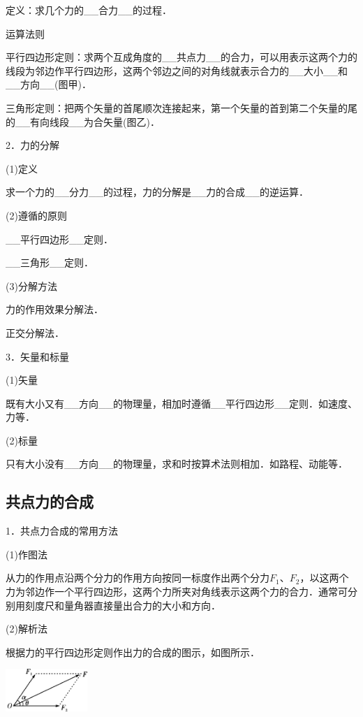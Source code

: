 定义：求几个力的\_\_合力\_\_的过程．

运算法则

平行四边形定则：求两个互成角度的\_\_共点力\_\_的合力，可以用表示这两个力的线段为邻边作平行四边形，这两个邻边之间的对角线就表示合力的\_\_大小\_\_和\_\_方向\_\_(图甲)．

三角形定则：把两个矢量的首尾顺次连接起来，第一个矢量的首到第二个矢量的尾的\_\_有向线段\_\_为合矢量(图乙)．

2．力的分解

(1)定义

求一个力的\_\_分力\_\_的过程，力的分解是\_\_力的合成\_\_的逆运算．

(2)遵循的原则

\_\_平行四边形\_\_定则．

\_\_三角形\_\_定则．

(3)分解方法

力的作用效果分解法．

正交分解法．

3．矢量和标量

(1)矢量

既有大小又有\_\_方向\_\_的物理量，相加时遵循\_\_平行四边形\_\_定则．如速度、力等．

(2)标量

只有大小没有\_\_方向\_\_的物理量，求和时按算术法则相加．如路程、动能等．
\newpage
\subsection{共点力的合成}

1．共点力合成的常用方法

(1)作图法

从力的作用点沿两个分力的作用方向按同一标度作出两个分力$F_1$、$F_2$，以这两个力为邻边作一个平行四边形，这两个力所夹对角线表示这两个力的合力．通常可分别用刻度尺和量角器直接量出合力的大小和方向．

(2)解析法

根据力的平行四边形定则作出力的合成的图示，如图所示．

\begin{center}\includegraphics[width=1.21875in,height=0.63542in]{media/image64.png}\end{center}

